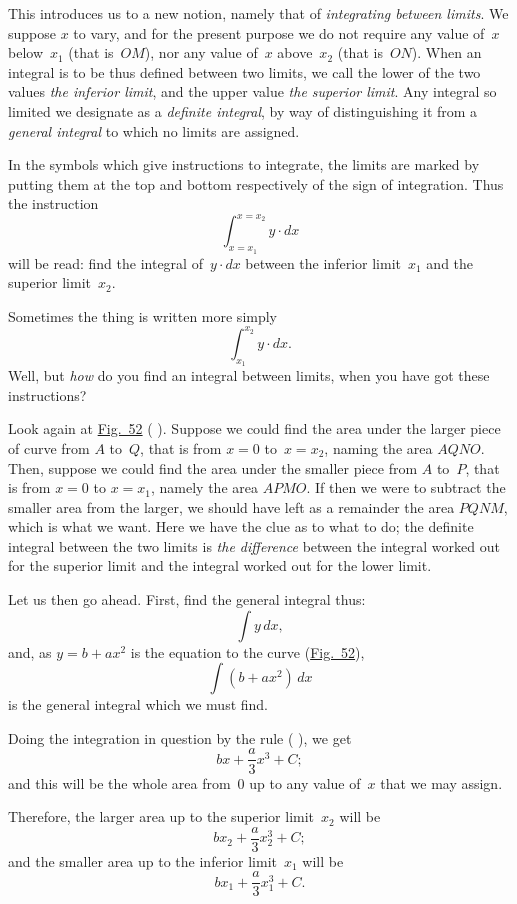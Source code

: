 \documentclass[12pt]{book}[2005/09/16]
\newcommand{\DPPageSep}[2]{\Pagelabel{#2}}
\newcommand{\Pagelabel}[1]
  {\phantomsection\label{#1}}
\newcommand{\Pageref}[2][p.]{%
  \ifthenelse{\not\equal{#1}{}}{%
    \hyperref[#2]{#1~\pageref{#2}}%
  }{%
    \hyperref[#2]{\pageref{#2}}%
  }%
}
\newcommand{\Fig}[1]{\hyperref[fig:#1]{Fig.~#1}}
\begin{document}
This introduces us to a new notion, namely that of
\emph{integrating between limits}. We suppose $x$ to vary,
and for the present purpose we do not require any
value of~$x$ below~$x_1$ (that is~$OM$), nor any value of~$x$
above~$x_2$ (that is~$ON$). When an integral is to be
thus defined between two limits, we call the lower
of the two values \emph{the inferior limit}, and the upper
value \emph{the superior limit}. Any integral so limited
we designate as a \emph{definite integral}, by way of distinguishing
it from a \emph{general integral} to which no
limits are assigned.

In the symbols which give instructions to integrate,
the limits are marked by putting them at the top
and bottom respectively of the sign of integration.
Thus the instruction
\[
\int_{x=x_1}^{x=x_2} y · dx
\]
\DPPageSep{221.png}{209}%
will be read: find the integral of~$y · dx$ between the
inferior limit~$x_1$ and the superior limit~$x_2$.

Sometimes the thing is written more simply
\[
\int^{x_2}_{x_1} y · dx.
\]
Well, but \emph{how} do you find an integral between limits,
when you have got these instructions?

Look again at \Fig{52} (\Pageref{fig:52}). Suppose we could %
find the area under the larger piece of curve from
$A$ to~$Q$, that is from $x = 0$ to~$x = x_2$, naming the area
$AQNO$. Then, suppose we could find the area under
the smaller piece from $A$ to~$P$, that is from $x = 0$ to
$x = x_1$, namely the area $APMO$. If then we were to
subtract the smaller area from the larger, we should
have left as a remainder the area $PQNM$, which is
what we want. Here we have the clue as to what
to do; the definite integral between the two limits is
\emph{the difference} between the integral worked out for
the superior limit and the integral worked out for the
lower limit.

Let us then go ahead. First, find the general
integral thus:
\[
\int y\, dx,
\]
and, as $y = b + ax^2$ is the equation to the curve (\Fig{52}),
\[
\int (b + ax^2)\, dx
\]
is the general integral which we must find.

Doing the integration in question by the rule
(\Pageref{section:9}), we get
\[
bx + \frac{a}{3} x^3 + C;
\]
\DPPageSep{222.png}{210}%
and this will be the whole area from~$0$ up to any
value of~$x$ that we may assign.

Therefore, the larger area up to the superior limit~$x_2$
will be
\[
bx_2 + \frac{a}{3} x_2^3 + C;
\]
and the smaller area up to the inferior limit~$x_1$ will be
\[
bx_1 + \frac{a}{3} x_1^3 + C.
\]
\end{document}
